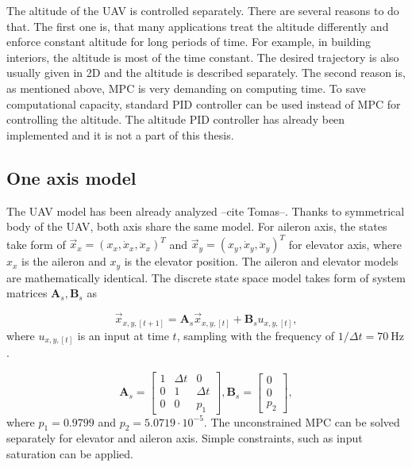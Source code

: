 \documentclass[a4paper,11pt,titlepage]{article}
\newcommand{\jed}[1]{\ensuremath{~\mathrm{#1}}}
\begin{document}
The altitude of the UAV is controlled separately. There are several reasons to do that. The first one is, that many applications treat the altitude differently and enforce constant altitude for long periods of time. For example, in building interiors, the altitude is most of the time constant. The desired trajectory is also usually given in 2D and the altitude is described separately. The second reason is, as mentioned above, MPC is very demanding on computing time. To save computational capacity, standard PID controller can be used instead of MPC for controlling the altitude. The altitude PID controller has already been implemented \cite{tomas} and it is not a part of this thesis. 

\subsection{One axis model}
The UAV model has been already analyzed --cite Tomas--. Thanks to symmetrical body of the UAV, both axis share the same model. For aileron axis, the states take form of $\vec{x}_x = (x_x, \dot{x}_x, \ddot{x}_x)^T$ and $\vec{x}_y = (x_y, \dot{x}_y, \ddot{x}_y)^T$ for elevator axis, where $x_x$ is the aileron and $x_y$ is the elevator position. The aileron and elevator models are mathematically identical. The discrete state space model takes form of system matrices $\textbf{A}_s, \textbf{B}_s$ as

\begin{equation}
\label{eq:state_space_model_simple}
\vec{x}_{x,y,[t+1]} = \textbf{A}_{s} \vec{x}_{x,y, [t]} +\textbf{B}_{s} u_{x,y, [t]},
\end{equation} 
where $u_{x,y,[t]}$ is an input at time $t$, sampling with the frequency of $1/\Delta t = 70\jed{Hz}$.

\begin{equation}
\textbf{A}_{s} =
  \begin{bmatrix}
  1 & \Delta t & 		0 \\
  0 & 		 1 & \Delta t \\
  0	& 		 0 &		p_1
  \end{bmatrix},\textbf{B}_{s} = \begin{bmatrix}
  0 \\
  0 \\
  p_2
  \end{bmatrix}, 
\end{equation}
where $p_1 = 0.9799$ and $p_2 = 5.0719\cdot10^{-5}$. The unconstrained MPC can be solved separately for elevator and aileron axis. Simple constraints, such as input saturation can be applied.
\end{document}
